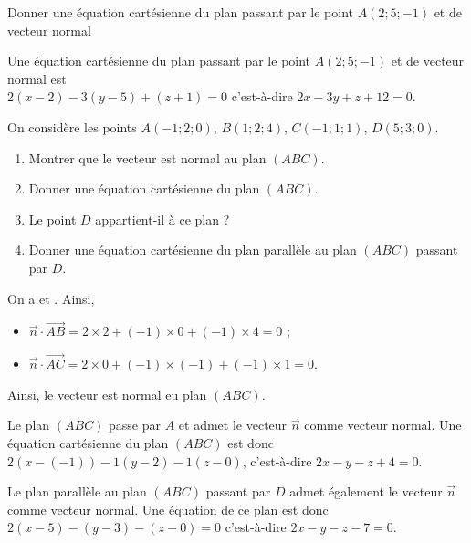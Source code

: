 \documentclass[11pt,fleqn, openany]{book} %
\begin{document}
\begin{exercise}[topic=geom14]Donner une équation cartésienne du plan passant par le point $A(2;5;-1)$ et de vecteur normal \end{exercise}

\begin{solution}Une équation cartésienne du plan passant par le point $A(2;5;-1)$ et de vecteur normal  est \\ $ 2(x-2)-3(y-5)+(z+1)=0$ c'est-à-dire $2x-3y+z+12=0$.\end{solution}



\begin{exercise}[topic=geom14] On considère les points $A(-1;2;0)$, $B(1;2;4)$, $C(-1;1;1)$, $D(5;3;0)$.

\begin{enumerate}
\item Montrer que le vecteur  est normal au plan $(ABC)$.
\item Donner une équation cartésienne du plan $(ABC)$.
\item Le point $D$ appartient-il à ce plan ?
\item Donner une équation cartésienne du plan parallèle au plan $(ABC)$ passant par $D$.
\end{enumerate}\end{exercise}

\begin{solution}On a  et . Ainsi,
\begin{itemize}
\item $\vec n \cdot \overrightarrow{AB}=2\times 2 +(-1) \times 0 + (-1) \times 4 = 0$ ;
\item $\vec n \cdot \overrightarrow{AC}=2\times 0 + (-1) \times (-1) + (-1) \times 1 = 0$.
\end{itemize}
Ainsi, le vecteur  est normal eu plan $(ABC)$.

Le plan $(ABC)$ passe par $A$ et admet le vecteur $\vec n$ comme vecteur normal. Une équation cartésienne du plan $(ABC)$ est donc $2(x-(-1))-1(y-2)-1(z-0)$, c'est-à-dire $2x-y-z+4=0$.

Le plan parallèle au plan $(ABC)$ passant par $D$ admet également le vecteur $\vec n$ comme vecteur normal. Une équation de ce plan est donc $2(x-5)-(y-3)-(z-0)=0$
c'est-à-dire $2x-y-z-7=0$.\end{solution}
\end{document}
